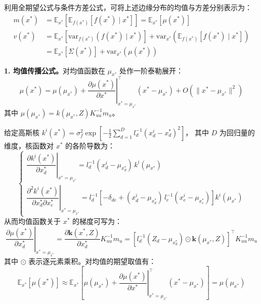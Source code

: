 利用全期望公式与条件方差公式，可将上述边缘分布的均值与方差分别表示为：
\begin{equation}
    \begin{aligned}
        m(x^{*}) &= \mathbb{E}_{x^{*}}\!\left[\mathbb{E}_{f(x^{*})}\!\left[f(x^{*})\mid x^{*}\right]\right]
        = \mathbb{E}_{x^{*}}\!\left[\mu(x^{*})\right] \\
        v(x^{*}) &= \mathbb{E}_{x^{*}}\!\left[\mathrm{var}_{f(x^{*})}\!\left(f(x^{*})\mid x^{*}\right)\right]
        + \mathrm{var}_{x^{*}}\!\left(\mathbb{E}_{f(x^{*})}\!\left[f(x^{*})\mid x^{*}\right]\right) \\
        &= \mathbb{E}_{x^{*}}\!\left[\Sigma(x^{*})\right] + \mathrm{var}_{x^{*}}\!\left(\mu(x^{*})\right)
    \end{aligned}
\end{equation}

\textbf{1. 均值传播公式。}对均值函数在 $\mu_{x^*}$ 处作一阶泰勒展开：
\begin{equation}
    \mu(x^*) = \mu(\mu_{x^*}) + \left.\frac{\partial\mu(x^*)}{\partial x^*}\right|_{x^*=\mu_{x^*}}^{\!\top}
    (x^* - \mu_{x^*}) + O\!\left(\|x^* - \mu_{x^*}\|^2\right)
\end{equation}
其中 $\mu(\mu_{x^*}) = k(\mu_{x^*}, Z) K_{uu}^{-1} m_u$。

给定高斯核
$k^i(x^*) = \sigma_f^2 \exp\!\left[-\frac{1}{2}\sum_{d=1}^{D} l_d^{-1}(x_d^i - x_d^*)^2\right]$，
其中 $D$ 为回归量的维度，核函数对 $x^*$ 的各阶导数为：
\begin{equation}
    \begin{cases}
        \left.\dfrac{\partial k^i(x^*)}{\partial x_d^*}\right|_{x^*=\mu_{x^*}} 
        = l_d^{-1}(x_d^i - \mu_{x^*_d})\, k^i(\mu_{x^*}) \\[8pt]
        \left.\dfrac{\partial^2 k^i(x^*)}{\partial x_d^* \partial x_e^*}\right|_{x^*=\mu_{x^*}} 
        = l_d^{-1}\!\left[-\delta_{de} + (x_d^i - \mu_{x^*_d})\, l_e^{-1}(x_e^i - \mu_{x^*_e})\right] k^i(\mu_{x^*})
    \end{cases}
\end{equation}
从而均值函数关于 $x^*$ 的梯度可写为：
\begin{equation}
    \left.\frac{\partial\mu(x^*)}{\partial x_d^*}\right|_{x^*=\mu_{x^*}}
    = \frac{\partial \mathbf{k}(x^*, Z)}{\partial x_d^*} K_{uu}^{-1} m_u
    = \left[l_d^{-1}(Z_d - \mu_{x^*_d}) \odot \mathbf{k}(\mu_{x^*}, Z)\right]^\top K_{uu}^{-1} m_u
\end{equation}
其中 $\odot$ 表示逐元素乘积。对均值的期望取值有：
\begin{equation}
    \mathbb{E}_{x^*}\!\left[\mu(x^*)\right] \approx \mathbb{E}_{x^*}\!\left[
        \mu(\mu_{x^*}) + \left.\frac{\partial\mu(x^*)}{\partial x^*}\right|_{x^*=\mu_{x^*}}^{\!\top}
        (x^* - \mu_{x^*})
    \right] = \mu(\mu_{x^*})
\end{equation}

